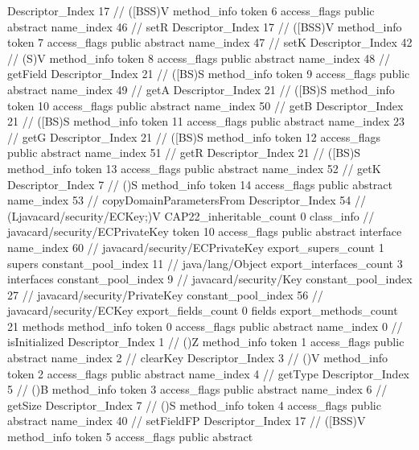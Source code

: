 {{{{{					Descriptor_Index	17		// ([BSS)V
				}
				method_info {
					token	6
					access_flags	public abstract
					name_index	46		// setR
					Descriptor_Index	17		// ([BSS)V
				}
				method_info {
					token	7
					access_flags	public abstract
					name_index	47		// setK
					Descriptor_Index	42		// (S)V
				}
				method_info {
					token	8
					access_flags	public abstract
					name_index	48		// getField
					Descriptor_Index	21		// ([BS)S
				}
				method_info {
					token	9
					access_flags	public abstract
					name_index	49		// getA
					Descriptor_Index	21		// ([BS)S
				}
				method_info {
					token	10
					access_flags	public abstract
					name_index	50		// getB
					Descriptor_Index	21		// ([BS)S
				}
				method_info {
					token	11
					access_flags	public abstract
					name_index	23		// getG
					Descriptor_Index	21		// ([BS)S
				}
				method_info {
					token	12
					access_flags	public abstract
					name_index	51		// getR
					Descriptor_Index	21		// ([BS)S
				}
				method_info {
					token	13
					access_flags	public abstract
					name_index	52		// getK
					Descriptor_Index	7		// ()S
				}
				method_info {
					token	14
					access_flags	public abstract
					name_index	53		// copyDomainParametersFrom
					Descriptor_Index	54		// (Ljavacard/security/ECKey;)V
				}
			}
			CAP22_inheritable_count	0
		}
		class_info {		// javacard/security/ECPrivateKey
			token	10
			access_flags	public abstract interface
			name_index	60		// javacard/security/ECPrivateKey
			export_supers_count	1
			supers {
				constant_pool_index	11		// java/lang/Object
			}
			export_interfaces_count	3
			interfaces {
				constant_pool_index	9		// javacard/security/Key
				constant_pool_index	27		// javacard/security/PrivateKey
				constant_pool_index	56		// javacard/security/ECKey
			}
			export_fields_count	0
			fields {
			}
			export_methods_count	21
			methods {
				method_info {
					token	0
					access_flags	public abstract
					name_index	0		// isInitialized
					Descriptor_Index	1		// ()Z
				}
				method_info {
					token	1
					access_flags	public abstract
					name_index	2		// clearKey
					Descriptor_Index	3		// ()V
				}
				method_info {
					token	2
					access_flags	public abstract
					name_index	4		// getType
					Descriptor_Index	5		// ()B
				}
				method_info {
					token	3
					access_flags	public abstract
					name_index	6		// getSize
					Descriptor_Index	7		// ()S
				}
				method_info {
					token	4
					access_flags	public abstract
					name_index	40		// setFieldFP
					Descriptor_Index	17		// ([BSS)V
				}
				method_info {
					token	5
					access_flags	public abstract
}}}}}
